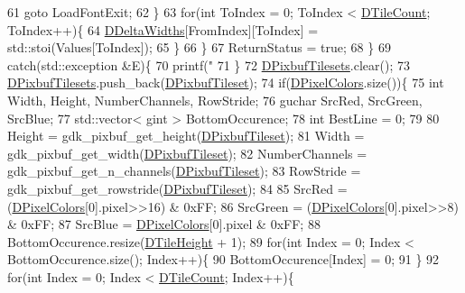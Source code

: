\begin{DoxyCode}
61                 \textcolor{keywordflow}{goto} LoadFontExit;
62             \}
63             \textcolor{keywordflow}{for}(\textcolor{keywordtype}{int} ToIndex = 0; ToIndex < \hyperlink{classCGraphicTileset_a39d942b370e47f441bf97385eb1037c8}{DTileCount}; ToIndex++)\{
64                 \hyperlink{classCFontTileset_a1e253853e14282e9582a7f47dace8f70}{DDeltaWidths}[FromIndex][ToIndex] = std::stoi(Values[ToIndex]);
65             \}
66         \}
67         ReturnStatus = \textcolor{keyword}{true};
68     \}
69     \textcolor{keywordflow}{catch}(std::exception &E)\{
70         printf(\textcolor{stringliteral}{"%
71     \}
72     \hyperlink{classCFontTileset_ae6e92dd613809fb15892b51e0e6b4940}{DPixbufTilesets}.clear();
73     \hyperlink{classCFontTileset_ae6e92dd613809fb15892b51e0e6b4940}{DPixbufTilesets}.push\_back(\hyperlink{classCGraphicTileset_a5d5adfcdbb347a6df3f57535ca08e3ef}{DPixbufTileset});
74     \textcolor{keywordflow}{if}(\hyperlink{classCGraphicTileset_a4e9672b8b133dbac600fb8bb400d1cb3}{DPixelColors}.size())\{
75         \textcolor{keywordtype}{int} Width, Height, NumberChannels, RowStride;
76         guchar SrcRed, SrcGreen, SrcBlue;
77         std::vector< gint > BottomOccurence;
78         \textcolor{keywordtype}{int} BestLine = 0;
79         
80         Height = gdk\_pixbuf\_get\_height(\hyperlink{classCGraphicTileset_a5d5adfcdbb347a6df3f57535ca08e3ef}{DPixbufTileset});
81         Width = gdk\_pixbuf\_get\_width(\hyperlink{classCGraphicTileset_a5d5adfcdbb347a6df3f57535ca08e3ef}{DPixbufTileset});
82         NumberChannels = gdk\_pixbuf\_get\_n\_channels(\hyperlink{classCGraphicTileset_a5d5adfcdbb347a6df3f57535ca08e3ef}{DPixbufTileset});
83         RowStride = gdk\_pixbuf\_get\_rowstride(\hyperlink{classCGraphicTileset_a5d5adfcdbb347a6df3f57535ca08e3ef}{DPixbufTileset});
84         
85         SrcRed = (\hyperlink{classCGraphicTileset_a4e9672b8b133dbac600fb8bb400d1cb3}{DPixelColors}[0].pixel>>16) & 0xFF;
86         SrcGreen = (\hyperlink{classCGraphicTileset_a4e9672b8b133dbac600fb8bb400d1cb3}{DPixelColors}[0].pixel>>8) & 0xFF;
87         SrcBlue = \hyperlink{classCGraphicTileset_a4e9672b8b133dbac600fb8bb400d1cb3}{DPixelColors}[0].pixel & 0xFF;
88         BottomOccurence.resize(\hyperlink{classCGraphicTileset_af48f32e07d5fe69afd5f764318cc3244}{DTileHeight} + 1);
89         \textcolor{keywordflow}{for}(\textcolor{keywordtype}{int} Index = 0; Index < BottomOccurence.size(); Index++)\{
90             BottomOccurence[Index] = 0;
91         \}
92         \textcolor{keywordflow}{for}(\textcolor{keywordtype}{int} Index = 0; Index < \hyperlink{classCGraphicTileset_a39d942b370e47f441bf97385eb1037c8}{DTileCount}; Index++)\{
}
\end{DoxyCode}
